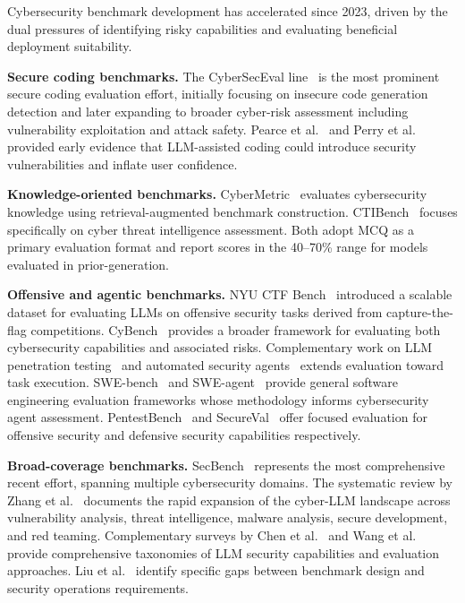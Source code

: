 \documentclass[journal]{IEEEtran}
\begin{document}
Cybersecurity benchmark development has accelerated since 2023, driven by the dual pressures of identifying risky capabilities and evaluating beneficial deployment suitability.

\textbf{Secure coding benchmarks.} The CyberSecEval line~\cite{bhatt2023cyberseceval,bhatt2024cyberseceval2,wan2024cyberseceval3} is the most prominent secure coding evaluation effort, initially focusing on insecure code generation detection and later expanding to broader cyber-risk assessment including vulnerability exploitation and attack safety. Pearce et al.~\cite{pearce2022copilot} and Perry et al.~\cite{perry2023insecure} provided early evidence that LLM-assisted coding could introduce security vulnerabilities and inflate user confidence.

\textbf{Knowledge-oriented benchmarks.} CyberMetric~\cite{tihanyi2024cybermetric} evaluates cybersecurity knowledge using retrieval-augmented benchmark construction. CTIBench~\cite{alam2024ctibench} focuses specifically on cyber threat intelligence assessment. Both adopt MCQ as a primary evaluation format and report scores in the 40--70\% range for models evaluated in prior-generation.

\textbf{Offensive and agentic benchmarks.} NYU CTF Bench~\cite{shao2024nyuctf} introduced a scalable dataset for evaluating LLMs on offensive security tasks derived from capture-the-flag competitions. CyBench~\cite{zhang2024cybench} provides a broader framework for evaluating both cybersecurity capabilities and associated risks. Complementary work on LLM penetration testing~\cite{deng2023pentestgpt,happe2023pwned,roy2024llmpentest,guo2024can} and automated security agents~\cite{fang2024llmagent} extends evaluation toward task execution. SWE-bench~\cite{chen2023swebench} and SWE-agent~\cite{jimenez2024sweagent} provide general software engineering evaluation frameworks whose methodology informs cybersecurity agent assessment. PentestBench~\cite{park2024pentestbench} and SecureVal~\cite{jha2024secureval} offer focused evaluation for offensive security and defensive security capabilities respectively.

\textbf{Broad-coverage benchmarks.} SecBench~\cite{jing2024secbench} represents the most comprehensive recent effort, spanning multiple cybersecurity domains. The systematic review by Zhang et al.~\cite{zhang2024llmcyber} documents the rapid expansion of the cyber-LLM landscape across vulnerability analysis, threat intelligence, malware analysis, secure development, and red teaming. Complementary surveys by Chen et al.~\cite{chen2024cyberllm} and Wang et al.~\cite{wang2024securityeval} provide comprehensive taxonomies of LLM security capabilities and evaluation approaches. Liu et al.~\cite{liu2024benchmarking} identify specific gaps between benchmark design and security operations requirements.
\end{document}
